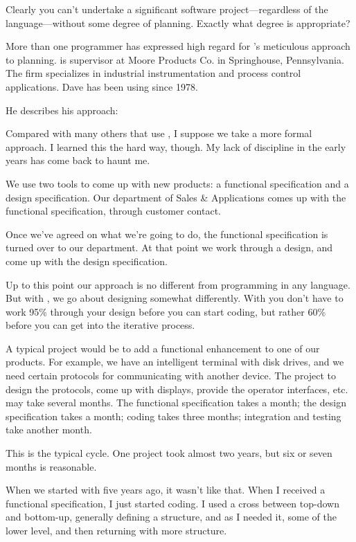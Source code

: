 Clearly you can't undertake a significant software
project---regardless of the language---without some degree of planning.
Exactly what degree is appropriate?%
\begin{interview}
\noindent More than one \Forth{} programmer has expressed high regard for
's meticulous approach to planning. 
is supervisor at Moore Products Co. in Springhouse, Pennsylvania. The firm
specializes in industrial instrumentation and process control
applications. Dave has been using \Forth{} since 1978.

He describes his approach:
\begin{tfquot}
Compared with many others that use \Forth{}, I suppose we take a more
formal approach. I learned this the hard way, though. My lack of
discipline in the early years has come back to haunt me.

We use two tools to come up with new products: a functional specification
and a design specification. Our department of Sales \& Applications comes
up with the functional specification, through customer contact.

Once we've agreed on what we're going to do, the functional
specification is turned over to our department. At that point we work
through a design, and come up with the design specification.

Up to this point our approach is no different from programming in any
language. But with \Forth{}, we go about designing somewhat
differently.  With \Forth{} you don't have to work 95\% through your
design before you can start coding, but rather 60\% before you can get
into the iterative process.


A typical project would be to add a functional enhancement to one of
our products. For example, we have an intelligent terminal with disk
drives, and we need certain protocols for communicating with another
device. The project to design the protocols, come up with displays,
provide the operator interfaces, etc. may take several months. The
functional specification takes a month; the design specification takes
a month; coding takes three months; integration and testing take
another month.

This is the typical cycle. One project took almost two years, but six
or seven months is reasonable.

When we started with \Forth{} five years ago, it wasn't like that. When I
received a functional specification, I just started coding. I used a
cross between top-down and bottom-up, generally defining a structure,
and as I needed it, some of the lower level, and then returning with
more structure.


\end{tfquot}
\end{interview}
